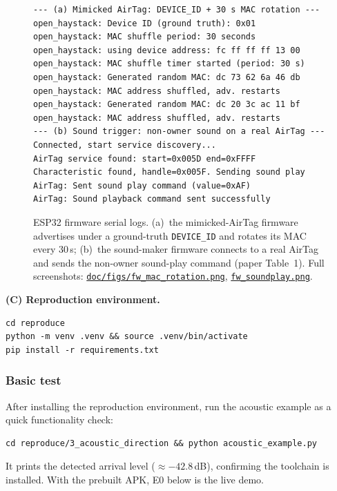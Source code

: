 \documentclass[nonacm,sigconf]{acmart}
\begin{document}
\begin{figure}[t]
\begin{lstlisting}[style=log]
--- (a) Mimicked AirTag: DEVICE_ID + 30 s MAC rotation ---
open_haystack: Device ID (ground truth): 0x01
open_haystack: MAC shuffle period: 30 seconds
open_haystack: using device address: fc ff ff ff 13 00
open_haystack: MAC shuffle timer started (period: 30 s)
open_haystack: Generated random MAC: dc 73 62 6a 46 db
open_haystack: MAC address shuffled, adv. restarts
open_haystack: Generated random MAC: dc 20 3c ac 11 bf
open_haystack: MAC address shuffled, adv. restarts
--- (b) Sound trigger: non-owner sound on a real AirTag ---
Connected, start service discovery...
AirTag service found: start=0x005D end=0xFFFF
Characteristic found, handle=0x005F. Sending sound play
AirTag: Sent sound play command (value=0xAF)
AirTag: Sound playback command sent successfully
\end{lstlisting}
  \caption{ESP32 firmware serial logs. (a)~the mimicked-AirTag firmware
  advertises under a ground-truth \texttt{DEVICE\_ID} and rotates its MAC every
  30\,s; (b)~the sound-maker firmware connects to a real AirTag and sends the
  non-owner sound-play command (paper Table~1). Full screenshots:
  \href{https://github.com/WANDS-HKUST/Snatcher/blob/main/doc/figs/fw_mac_rotation.png}{\texttt{doc/figs/fw\_mac\_rotation.png}},
  \href{https://github.com/WANDS-HKUST/Snatcher/blob/main/doc/figs/fw_soundplay.png}{\texttt{fw\_soundplay.png}}.}
  \label{fig:ae_fw}
\end{figure}

\noindent\textbf{(C) Reproduction environment.}
\begin{lstlisting}
cd reproduce
python -m venv .venv && source .venv/bin/activate
pip install -r requirements.txt
\end{lstlisting}

\subsubsection{Basic test}
After installing the reproduction environment, run the acoustic example as a
quick functionality check:
\begin{lstlisting}
cd reproduce/3_acoustic_direction && python acoustic_example.py
\end{lstlisting}
It prints the detected arrival level ($\approx-42.8$\,dB), confirming the
toolchain is installed. With the prebuilt APK, E0 below is the live demo.
\end{document}
